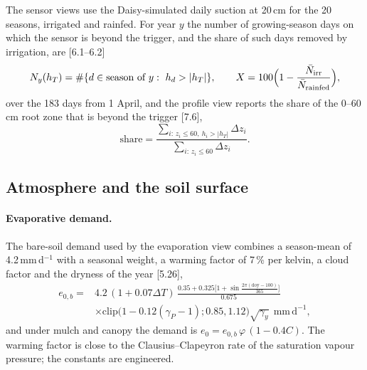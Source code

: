 The sensor views use the Daisy-simulated daily suction at 20\,cm for the 20 seasons, irrigated and rainfed. For year $y$ the number of growing-season days on which the sensor is beyond the trigger, and the share of such days removed by irrigation, are [6.1--6.2]
\begin{equation}
N_y(h_T)=\#\{d\in\text{season of }y:\ h_d>|h_T|\},\qquad X=100\Bigl(1-\frac{\bar N_{\mathrm{irr}}}{\bar N_{\mathrm{rainfed}}}\Bigr),
\label{eq:Ny}
\end{equation}
over the 183 days from 1 April, and the profile view reports the share of the 0--60\,cm root zone that is beyond the trigger [7.6],
\begin{equation}
\mathrm{share}=\frac{\sum_{i:\,z_i\le60,\ h_i>|h_T|}\Delta z_i}{\sum_{i:\,z_i\le60}\Delta z_i}.
\label{eq:share}
\end{equation}

\subsection{Atmosphere and the soil surface}
\label{sec:sys-atmos}
\paragraph{Evaporative demand.} The bare-soil demand used by the evaporation view combines a season-mean of 4.2\,mm\,d$^{-1}$ with a seasonal weight, a warming factor of 7\,\% per kelvin, a cloud factor and the dryness of the year [5.26],
\begin{equation}
\begin{aligned}e_{0,b}={}&4.2\,(1+0.07\Delta T)\,\frac{0.35+0.325\bigl[1+\sin\frac{2\pi(\mathrm{doy}-100)}{365}\bigr]}{0.675}\\&\times\mathrm{clip}\bigl(1-0.12(\gamma_P-1);0.85,1.12\bigr)\sqrt{\gamma_y}\ \ \mathrm{mm\,d^{-1}},\end{aligned}
\label{eq:e0}
\end{equation}
and under mulch and canopy the demand is $e_0=e_{0,b}\,\varphi\,(1-0.4C)$. The warming factor is close to the Clausius--Clapeyron rate of the saturation vapour pressure; the constants are engineered.

